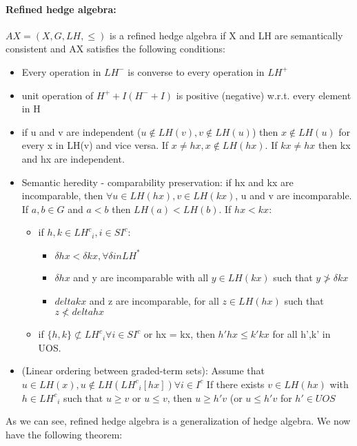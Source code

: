 \documentclass[26pt,fleqn,]{article}
\begin{document}
\paragraph{Refined hedge algebra: } \(AX = (X,G,LH,\le)\) is a refined hedge algebra if X and LH are
semantically consistent and AX satisfies the following conditions:\\
\begin{itemize}
	\item Every operation in \(LH^-\) is converse to every operation in \(LH^+\)
	\item unit operation of \(H^++I (H^-+I) \) is positive (negative) w.r.t. every element in H
	\item if u and v are independent (\( u \notin LH(v), v \notin LH(u)\)) then \(x \notin LH(u)\) 
	for every x in LH(v) and vice versa. If \(x \neq hx, x\notin LH(hx)\). If \(kx \neq hx\) then kx
	and hx are independent.
	\item Semantic heredity - comparability preservation: if hx and kx are incomparable, then \(
	\forall u \in LH(hx), v \in LH(kx)\), u and v are incomparable. If \(a,b \in G\) and \(a<b\)
	then \(LH(a) < LH(b)\). If \(hx < kx\):\\
	\begin{itemize}
		\item if \(h,k \in {LH^c}_i, i \in SI^c\):
			\begin{itemize}
				\item \(\delta hx < \delta kx, \forall \delta in LH^*\)
				\item \(\delta hx\) and y are incomparable with all \(y \in LH(kx)\)
					such that \(y \not> \delta kx\)
				\item \(delta kx\) and z are incomparable, for all \(z \in LH(hx)\)
					such that \(z \not< delta hx\)
			\end{itemize}
		\item if \(\{h,k\} \not\subset {LH^c}_i \forall i \in SI^c\) or hx = kx, then 
			\(h'hx \le k'kx\) for all h',k' in UOS.
	\end{itemize}
	\item (Linear ordering between graded-term sets): Assume that \(u \in LH(x), u\notin 
		LH({LH^c}_i[hx]) \forall i \in I^c\) If there exists \(v \in LH(hx)\) with 
		\(h \in {LH^c}_i\) such that \(u \ge v\) or \(u \le v\), then \(u \ge h'v\) 
		(or \(u \le h'v\) for \(h' \in UOS\)	
\end{itemize}
As we can see, refined hedge algebra is a generalization of hedge algebra. We now have the following 
theorem:\\
\end{document}
